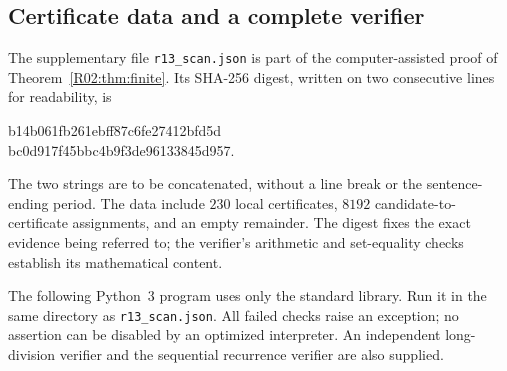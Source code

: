 \documentclass[11pt,a4paper]{article}
\theoremstyle{definition}\newtheorem{definition}[theorem]{Definition}
\theoremstyle{remark}\newtheorem{remark}[theorem]{Remark}
\begin{document}
\subsection{Certificate data and a complete verifier}
\label{R02:app:verification}

The supplementary file \texttt{r13\_scan.json} is part of the
computer-assisted proof of Theorem~\ref{R02:thm:finite}. Its SHA-256 digest,
written on two consecutive lines for readability, is
\begin{center}\ttfamily\small
b14b061fb261ebff87c6fe27412bfd5d\\
bc0d917f45bbc4b9f3de96133845d957.
\end{center}
The two strings are to be concatenated, without a line break or the
sentence-ending period. The data include $230$ local certificates,
$8192$ candidate-to-certificate assignments, and an empty remainder.
The digest fixes the exact evidence being referred to; the verifier's
arithmetic and set-equality checks establish its mathematical content.

The following Python~3 program uses only the standard library. Run it
in the same directory as \texttt{r13\_scan.json}. All failed checks
raise an exception; no assertion can be disabled by an optimized
interpreter. An independent long-division verifier and the sequential
recurrence verifier are also supplied.
\end{document}
